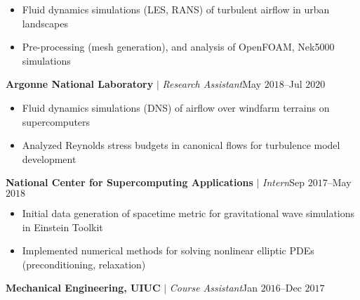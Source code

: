 \documentclass[10pt]{article}
\begin{document}
\begin{multicols}{2}
\vspace{-1.75em}
\begin{itemize}[label=-,leftmargin=1.0em]
    \setlength\itemsep{-0.25em}
    \item Fluid dynamics simulations (LES, RANS) of turbulent airflow in urban landscapes
    \item Pre-processing (mesh generation), and analysis of OpenFOAM, Nek5000 simulations
\end{itemize}
\vspace{-2.0em}

\vspace{0.5em}
%
\textbf{Argonne National Laboratory} $|$ \textit{Research Assistant}\hfill May $2018$--Jul $2020$

\vspace{-1.75em}
\begin{itemize}[label=-,leftmargin=1.0em]
    \setlength\itemsep{-0.25em}
    \item Fluid dynamics simulations (DNS) of airflow over windfarm terrains on supercomputers
    \item Analyzed Reynolds stress budgets in canonical flows for turbulence model development
\end{itemize}
\vspace{-2.0em}

\vspace{0.5em}
%
\textbf{National Center for Supercomputing Applications} $|$ \textit{Intern}\hfill Sep $2017$--May $2018$

\vspace{-1.75em}
\begin{itemize}[label=-,leftmargin=1.0em]
    \setlength\itemsep{-0.25em}
    \item Initial data generation of spacetime metric for gravitational wave simulations in Einstein Toolkit
    \item Implemented numerical methods for solving nonlinear elliptic PDEs (preconditioning, relaxation)
\end{itemize}
\vspace{-2.0em}

\vspace{0.5em}
%
\textbf{Mechanical Engineering, UIUC} $|$ \textit{Course Assistant}\hfill Jan $2016$--Dec $2017$


\end{multicols}
\end{document}
